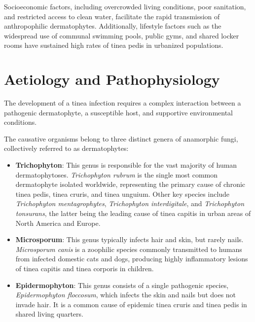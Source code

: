 Socioeconomic factors, including overcrowded living conditions, poor sanitation, and restricted access to clean water, facilitate the rapid transmission of anthropophilic dermatophytes. Additionally, lifestyle factors such as the widespread use of communal swimming pools, public gyms, and shared locker rooms have sustained high rates of tinea pedis in urbanized populations.

\section*{Aetiology and Pathophysiology}
The development of a tinea infection requires a complex interaction between a pathogenic dermatophyte, a susceptible host, and supportive environmental conditions.

The causative organisms belong to three distinct genera of anamorphic fungi, collectively referred to as dermatophytes:
\begin{itemize}
    \item \textbf{Trichophyton}: This genus is responsible for the vast majority of human dermatophytoses. \textit{Trichophyton rubrum} is the single most common dermatophyte isolated worldwide, representing the primary cause of chronic tinea pedis, tinea cruris, and tinea unguium. Other key species include \textit{Trichophyton mentagrophytes}, \textit{Trichophyton interdigitale}, and \textit{Trichophyton tonsurans}, the latter being the leading cause of tinea capitis in urban areas of North America and Europe.
    \item \textbf{Microsporum}: This genus typically infects hair and skin, but rarely nails. \textit{Microsporum canis} is a zoophilic species commonly transmitted to humans from infected domestic cats and dogs, producing highly inflammatory lesions of tinea capitis and tinea corporis in children.
    \item \textbf{Epidermophyton}: This genus consists of a single pathogenic species, \textit{Epidermophyton floccosum}, which infects the skin and nails but does not invade hair. It is a common cause of epidemic tinea cruris and tinea pedis in shared living quarters.
\end{itemize}

